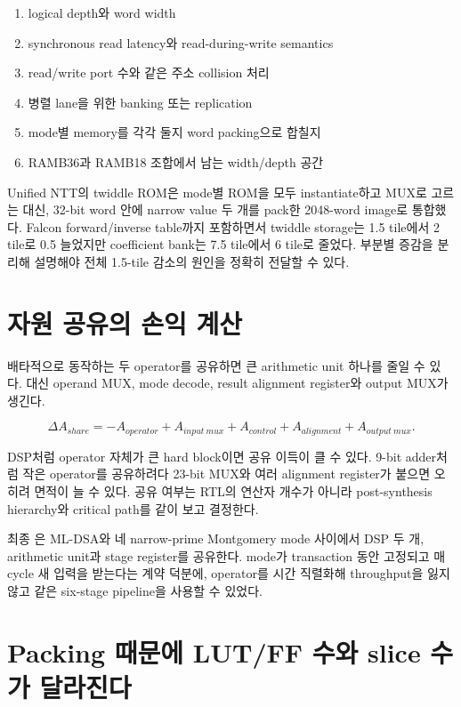 \begin{summarybox}
\begin{enumerate}
  \item logical depth와 word width
  \item synchronous read latency와 read-during-write semantics
  \item read/write port 수와 같은 주소 collision 처리
  \item 병렬 lane을 위한 banking 또는 replication
  \item mode별 memory를 각각 둘지 word packing으로 합칠지
  \item RAMB36과 RAMB18 조합에서 남는 width/depth 공간
\end{enumerate}
\end{summarybox}

Unified NTT의 twiddle ROM은 mode별 ROM을 모두 instantiate하고 MUX로 고르는 대신,
32-bit word 안에 narrow value 두 개를 pack한 2048-word image로 통합했다. Falcon
forward/inverse table까지 포함하면서 twiddle storage는 1.5 tile에서 2 tile로
0.5 늘었지만 coefficient bank는 7.5 tile에서 6 tile로 줄었다. 부분별 증감을
분리해 설명해야 전체 1.5-tile 감소의 원인을 정확히 전달할 수 있다.

\section{자원 공유의 손익 계산}

배타적으로 동작하는 두 operator를 공유하면 큰 arithmetic unit 하나를 줄일 수
있다. 대신 operand MUX, mode decode, result alignment register와 output MUX가
생긴다.

\[
\Delta A_{share}
=-A_{operator}+A_{input\ mux}+A_{control}+A_{alignment}+A_{output\ mux}.
\]

DSP처럼 operator 자체가 큰 hard block이면 공유 이득이 클 수 있다. 9-bit adder처럼
작은 operator를 공유하려다 23-bit MUX와 여러 alignment register가 붙으면 오히려
면적이 늘 수 있다. 공유 여부는 RTL의 연산자 개수가 아니라 post-synthesis
hierarchy와 critical path를 같이 보고 결정한다.

최종 은 ML-DSA와 네 narrow-prime Montgomery mode 사이에서
DSP 두 개, arithmetic unit과 stage register를 공유한다. mode가 transaction 동안
고정되고 매 cycle 새 입력을 받는다는 계약 덕분에, operator를 시간 직렬화해
throughput을 잃지 않고 같은 six-stage pipeline을 사용할 수 있었다.

\section{Packing 때문에 LUT/FF 수와 slice 수가 달라진다}

